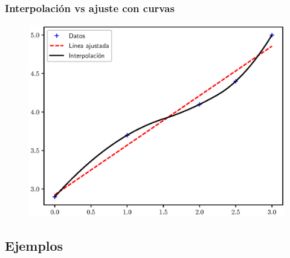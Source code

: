 \documentclass[12pt]{beamer}
\begin{document}
\begin{frame}[fragile]
\frametitle{Interpolación vs ajuste con curvas}
\begin{figure}
    \centering
    \includegraphics[scale=0.6]{Imagenes/Intro_Interpolacion_003.eps}
\end{figure}
\end{frame}

\subsection*{Ejemplos}
\end{document}
